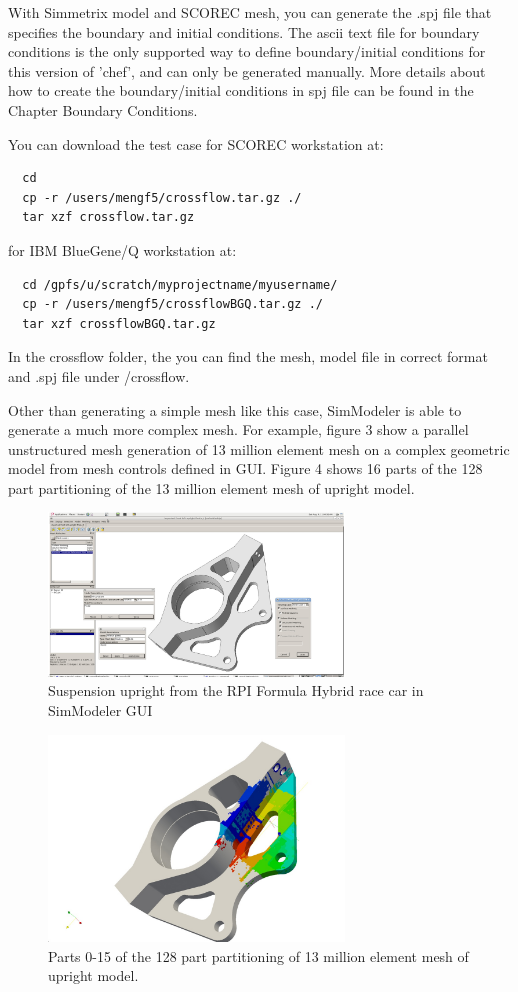 \documentclass{article}
\begin{document}
With Simmetrix model and SCOREC mesh, you can generate the .spj file that specifies the boundary and initial conditions. The ascii text file for boundary conditions is the only supported way to define boundary/initial conditions for this version of 'chef', and can only be generated manually. More details about how to create the boundary/initial conditions in spj file can be found in the Chapter Boundary Conditions. 

You can download the test case for SCOREC workstation at:
   \begin{lstlisting}
  cd
  cp -r /users/mengf5/crossflow.tar.gz ./
  tar xzf crossflow.tar.gz
  \end{lstlisting}
for IBM BlueGene/Q workstation at:
  \begin{lstlisting}
  cd /gpfs/u/scratch/myprojectname/myusername/
  cp -r /users/mengf5/crossflowBGQ.tar.gz ./
  tar xzf crossflowBGQ.tar.gz
  \end{lstlisting}
In the crossflow folder, the you can find the mesh, model file in correct format and .spj file under /crossflow.

Other than generating a simple mesh like this case, SimModeler is able to generate a much more complex mesh. For example, figure 3 show a parallel unstructured mesh generation of 13 million element mesh on a complex geometric model from mesh controls defined in GUI. Figure 4 shows 16 parts of the 128 part partitioning of the 13 million element mesh of upright model.

\begin{figure}[h!]
  \centering
    \includegraphics[width=0.7\textwidth]{albany1}
  \caption{Suspension upright from the RPI Formula Hybrid race car in SimModeler GUI}
\end{figure}
\begin{figure}[h!]
  \centering
    \includegraphics[width=0.7\textwidth]{albany2}
  \caption{Parts 0-15 of the 128 part partitioning of 13 million element mesh of upright model.}
\end{figure}
\end{document}
